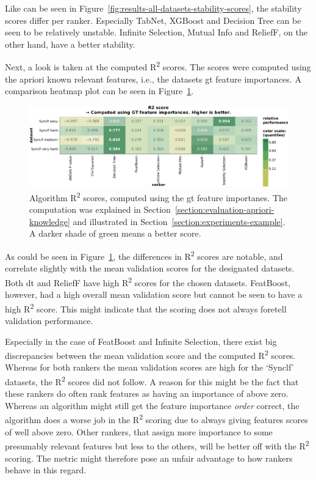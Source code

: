 \documentclass[../main.tex]{subfiles}
\begin{document}
Like can be seen in Figure~\ref{fig:results-all-datasets-stability-scores}, the stability scores differ per ranker. Especially TabNet, XGBoost and Decision Tree can be seen to be relatively unstable. Infinite Selection, Mutual Info and ReliefF, on the other hand, have a better stability.

Next, a look is taken at the computed R\textsuperscript{2} scores. The scores were computed using the \gls{apriori} known relevant features, i.e., the datasets \gls{gt} feature importances. A comparison heatmap plot can be seen in Figure~\ref{fig:results-all-datasets-r2-scores}.

\begin{figure}[ht]
    \centering
    \includegraphics[width=\linewidth]{report/images/results-all-datasets-r2-scores.pdf}
    \caption{Algorithm R\textsuperscript{2} scores, computed using the \gls{gt} feature importanes. The computation was explained in Section~\ref{section:evaluation-apriori-knowledge} and illustrated in Section~\ref{section:experiments-example}. A darker shade of green means a better score.}
    \label{fig:results-all-datasets-r2-scores}
\end{figure}

As could be seen in Figure~\ref{fig:results-all-datasets-r2-scores}, the differences in R\textsuperscript{2} scores are notable, and correlate slightly with the mean validation scores for the designated datasets. Both \gls{dt} and ReliefF have high R\textsuperscript{2} scores for the chosen datasets. FeatBoost, however, had a high overall mean validation score but cannot be seen to have a high R\textsuperscript{2} score. This might indicate that the scoring does not always foretell validation performance.

Especially in the case of FeatBoost and Infinite Selection, there exist big discrepancies between the mean validation score and the computed R\textsuperscript{2} scores. Whereas for both rankers the mean validation scores are high for the `Synclf' datasets, the R\textsuperscript{2} scores did not follow. A reason for this might be the fact that these rankers do often rank features as having an importance of above zero. Whereas an algorithm might still get the feature importance \textit{order} correct, the algorithm does a worse job in the R\textsuperscript{2} scoring due to always giving features scores of well above zero. Other rankers, that assign more importance to some presumably relevant features but less to the others, will be better off with the R\textsuperscript{2} scoring. The metric might therefore pose an unfair advantage to how rankers behave in this regard.
\end{document}
